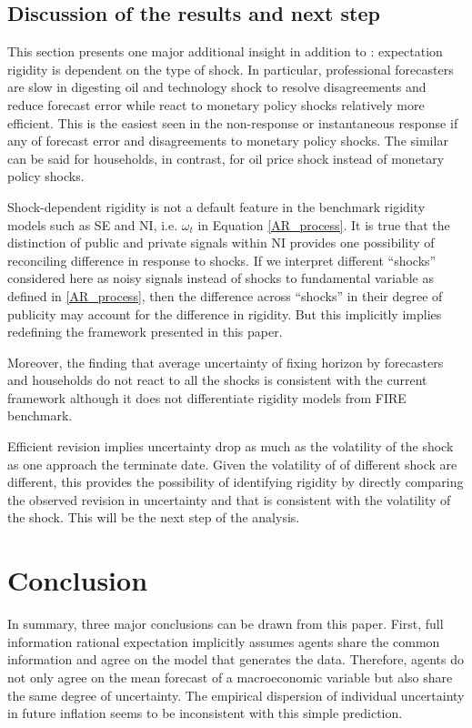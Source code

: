 \documentclass[]{article}
\begin{document}
	\subsection{Discussion of the results and next step}
	
	This section presents one major additional insight in addition to \cite{coibion2012can}: expectation rigidity is dependent on the type of shock. In particular, professional forecasters are slow in digesting oil and technology shock to resolve disagreements and reduce forecast error while react to monetary policy shocks relatively more efficient. This is the easiest seen in the non-response or instantaneous response if any of forecast error and disagreements to monetary policy shocks. The similar can be said for households, in contrast, for oil price shock instead of monetary policy shocks.
	
	Shock-dependent rigidity is not a default feature in the benchmark rigidity models such as SE and NI, i.e. $\omega_t$ in Equation \ref{AR_process}. It is true that the distinction of public and private signals within NI provides one possibility of reconciling difference in response to shocks.  If we interpret different ``shocks'' considered here as noisy signals instead of shocks to fundamental variable as defined in \ref{AR_process}, then the difference across ``shocks'' in their degree of publicity may account for the difference in rigidity.  But this implicitly implies redefining the  framework presented in this paper. 
	
	Moreover, the finding that average uncertainty of fixing horizon by forecasters and households do not react to all the shocks is consistent with the current framework although it does not differentiate rigidity models from FIRE benchmark.  
	
	Efficient revision implies  uncertainty drop as much as the volatility of the shock as one approach the terminate date. Given the volatility of of different shock are different, this provides the possibility of identifying rigidity by directly comparing the observed revision in uncertainty and that is consistent with the volatility of the shock. This will be the next step of the analysis.  
	
	\section{Conclusion}\label{Conclusion}
	
	In summary, three major conclusions can be drawn from this paper.  First, full information rational expectation implicitly assumes agents share the common information and agree on the model that generates the data. Therefore, agents do not only agree on the mean forecast of a macroeconomic variable but also share the same degree of uncertainty. The empirical dispersion of individual uncertainty in future inflation seems to be inconsistent with this simple prediction. 
	
\end{document}
